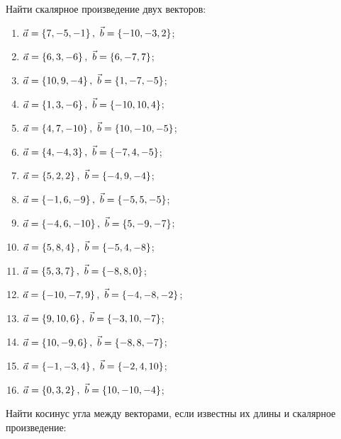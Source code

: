 	\vspace{15pt}
	Найти скалярное произведение двух векторов:

	\begin{enumerate}
		\setcounter{enumi}{\value{tasks}}

		\item \( \displaystyle \vec{a} = \left\lbrace 7, -5, -1 \right\rbrace, ~ \vec{b} = \left\lbrace -10, -3, 2 \right\rbrace \);
		\item \( \displaystyle \vec{a} = \left\lbrace 6, 3, -6 \right\rbrace, ~ \vec{b} = \left\lbrace 6, -7, 7 \right\rbrace \);
		\item \( \displaystyle \vec{a} = \left\lbrace 10, 9, -4 \right\rbrace, ~ \vec{b} = \left\lbrace 1, -7, -5 \right\rbrace \);
		\item \( \displaystyle \vec{a} = \left\lbrace 1, 3, -6 \right\rbrace, ~ \vec{b} = \left\lbrace -10, 10, 4 \right\rbrace \);
		\item \( \displaystyle \vec{a} = \left\lbrace 4, 7, -10 \right\rbrace, ~ \vec{b} = \left\lbrace 10, -10, -5 \right\rbrace \);
		\item \( \displaystyle \vec{a} = \left\lbrace 4, -4, 3 \right\rbrace, ~ \vec{b} = \left\lbrace -7, 4, -5 \right\rbrace \);
		\item \( \displaystyle \vec{a} = \left\lbrace 5, 2, 2 \right\rbrace, ~ \vec{b} = \left\lbrace -4, 9, -4 \right\rbrace \);
		\item \( \displaystyle \vec{a} = \left\lbrace -1, 6, -9 \right\rbrace, ~ \vec{b} = \left\lbrace -5, 5, -5 \right\rbrace \);
		\item \( \displaystyle \vec{a} = \left\lbrace -4, 6, -10 \right\rbrace, ~ \vec{b} = \left\lbrace 5, -9, -7 \right\rbrace \);
		\item \( \displaystyle \vec{a} = \left\lbrace 5, 8, 4 \right\rbrace, ~ \vec{b} = \left\lbrace -5, 4, -8 \right\rbrace \);
		\item \( \displaystyle \vec{a} = \left\lbrace 5, 3, 7 \right\rbrace, ~ \vec{b} = \left\lbrace -8, 8, 0 \right\rbrace \);
		\item \( \displaystyle \vec{a} = \left\lbrace -10, -7, 9 \right\rbrace, ~ \vec{b} = \left\lbrace -4, -8, -2 \right\rbrace \);
		\item \( \displaystyle \vec{a} = \left\lbrace 9, 10, 6 \right\rbrace, ~ \vec{b} = \left\lbrace -3, 10, -7 \right\rbrace \);
		\item \( \displaystyle \vec{a} = \left\lbrace 10, -9, 6 \right\rbrace, ~ \vec{b} = \left\lbrace -8, 8, -7 \right\rbrace \);
		\item \( \displaystyle \vec{a} = \left\lbrace -1, -3, 4 \right\rbrace, ~ \vec{b} = \left\lbrace -2, 4, 10 \right\rbrace \);
		\item \( \displaystyle \vec{a} = \left\lbrace 0, 3, 2 \right\rbrace, ~ \vec{b} = \left\lbrace 10, -10, -4 \right\rbrace \);

		\setcounter{tasks}{\value{enumi}}
	\end{enumerate}

	\vspace{15pt}
	Найти косинус угла между векторами, если известны их длины и скалярное произведение:

